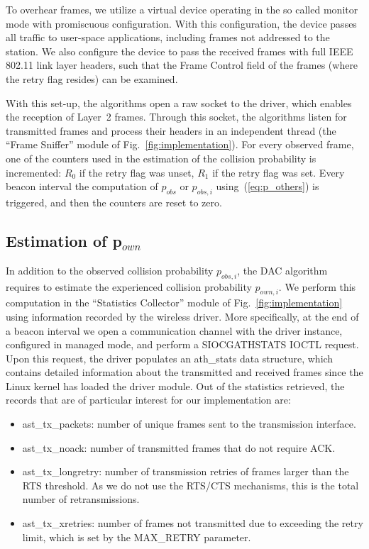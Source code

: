 \documentclass[a4paper,10pt]{article}
\begin{document}
To overhear frames, we utilize a virtual device operating in the so called {\ttfamily monitor} mode with promiscuous configuration. With this configuration, the device passes all traffic to user-space applications, including frames not addressed to the station. We also configure the device to pass the received frames with full IEEE 802.11 link layer headers, such that the Frame Control field of the frames (where the retry flag resides) can be examined. 

With this set-up, the algorithms open a {\ttfamily raw} socket to the driver, which enables the reception of Layer~2 frames. Through this socket, the algorithms listen for transmitted frames and process their headers in an independent thread (the ``Frame Sniffer'' module of Fig.~\ref{fig:implementation}). For every observed frame, one of the counters used in the estimation of the collision probability is incremented: $R_0$ if the retry flag was unset, $R_1$ if the retry flag was set. Every beacon interval the computation of $p_{obs}$ or $p_{obs,i}$ using~(\ref{eq:p_others}) is triggered, and then the counters are reset to zero. 

\subsection{Estimation of p$_{own}$}
\label{sec:pown}

In addition to the observed collision probability $p_{obs,i}$, the DAC algorithm requires to estimate the experienced collision probability $p_{own,i}$. We perform this computation in the ``Statistics Collector'' module of Fig.~\ref{fig:implementation} using information recorded by the wireless driver. More specifically, at the end of a beacon interval we open a communication channel with the driver instance, configured in {\ttfamily managed} mode, and perform a {\ttfamily SIOCGATHSTATS IOCTL} request. Upon this request, the driver populates an {\ttfamily ath\_stats} data structure, which contains detailed information about the transmitted and received frames since the Linux kernel has loaded the driver module. Out of the statistics retrieved, the records that are of particular interest for our implementation are: 
\begin{itemize}
  \item {\ttfamily ast\_tx\_packets}: number of unique frames sent to the transmission interface.
  \item {\ttfamily ast\_tx\_noack}: number of transmitted frames that do not require ACK.
  \item {\ttfamily ast\_tx\_longretry}: number of transmission retries of frames larger than the RTS threshold. As we do not use the RTS/CTS mechanisms, this is the total number of retransmissions.
  \item {\ttfamily ast\_tx\_xretries}: number of frames not transmitted due to exceeding the retry limit, which is set by the {\ttfamily MAX\_RETRY} parameter.
\end{itemize}
\end{document}

